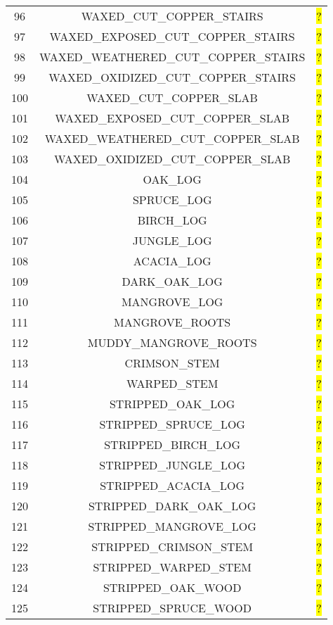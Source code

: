 \documentclass[11pt]{article}
\newcommand\myworries[1]{\sethlcolor{red}\hl{#1}}
\begin{document}
\begin{longtable}{ |c|c|c| }
	96 & WAXED\_CUT\_COPPER\_STAIRS & \myworries{?} \\
	97 & WAXED\_EXPOSED\_CUT\_COPPER\_STAIRS & \myworries{?} \\
	98 & WAXED\_WEATHERED\_CUT\_COPPER\_STAIRS & \myworries{?} \\
	99 & WAXED\_OXIDIZED\_CUT\_COPPER\_STAIRS & \myworries{?} \\
	100 & WAXED\_CUT\_COPPER\_SLAB & \myworries{?} \\
	101 & WAXED\_EXPOSED\_CUT\_COPPER\_SLAB & \myworries{?} \\
	102 & WAXED\_WEATHERED\_CUT\_COPPER\_SLAB & \myworries{?} \\
	103 & WAXED\_OXIDIZED\_CUT\_COPPER\_SLAB & \myworries{?} \\
	104 & OAK\_LOG & \myworries{?} \\
	105 & SPRUCE\_LOG & \myworries{?} \\
	106 & BIRCH\_LOG & \myworries{?} \\
	107 & JUNGLE\_LOG & \myworries{?} \\
	108 & ACACIA\_LOG & \myworries{?} \\
	109 & DARK\_OAK\_LOG & \myworries{?} \\
	110 & MANGROVE\_LOG & \myworries{?} \\
	111 & MANGROVE\_ROOTS & \myworries{?} \\
	112 & MUDDY\_MANGROVE\_ROOTS & \myworries{?} \\
	113 & CRIMSON\_STEM & \myworries{?} \\
	114 & WARPED\_STEM & \myworries{?} \\
	115 & STRIPPED\_OAK\_LOG & \myworries{?} \\
	116 & STRIPPED\_SPRUCE\_LOG & \myworries{?} \\
	117 & STRIPPED\_BIRCH\_LOG & \myworries{?} \\
	118 & STRIPPED\_JUNGLE\_LOG & \myworries{?} \\
	119 & STRIPPED\_ACACIA\_LOG & \myworries{?} \\
	120 & STRIPPED\_DARK\_OAK\_LOG & \myworries{?} \\
	121 & STRIPPED\_MANGROVE\_LOG & \myworries{?} \\
	122 & STRIPPED\_CRIMSON\_STEM & \myworries{?} \\
	123 & STRIPPED\_WARPED\_STEM & \myworries{?} \\
	124 & STRIPPED\_OAK\_WOOD & \myworries{?} \\
	125 & STRIPPED\_SPRUCE\_WOOD & \myworries{?} \\

\end{longtable}
\end{document}
